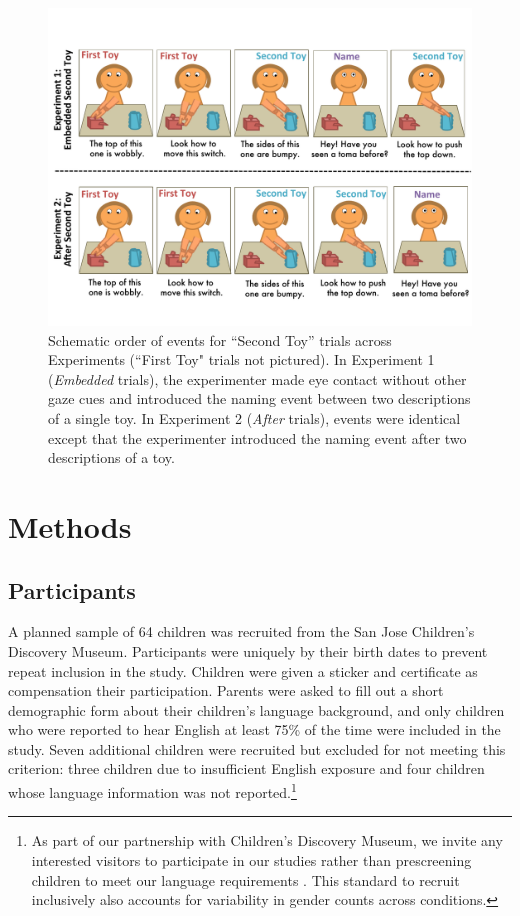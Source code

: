 \documentclass[man]{apa2}
\begin{document}
\begin{figure} 
  \begin{center} 
    \includegraphics[width=6in]{figures/continuity_demo_slide.pdf} 
    \caption{\label{fig:demo} Schematic order of events for ``Second Toy'' trials across Experiments (``First Toy" trials not pictured). In Experiment 1 (\emph{Embedded} trials), the experimenter made eye contact without other gaze cues and introduced the naming event between two descriptions of a single toy.  In Experiment 2 (\emph{After} trials), events were identical except that the experimenter introduced the naming event after two descriptions of a toy.} 
  \end{center} 
\end{figure}	

\section{Methods}


\subsection{Participants}

A planned sample of 64 children was recruited from the San Jose Children's Discovery Museum.  Participants were uniquely by their birth dates to prevent repeat inclusion in the study.  Children were given a sticker and certificate as compensation their participation.  Parents were asked to fill out a short demographic form about their children's language background, and only children who were reported to hear English at least 75\% of the time were included in the study.  Seven additional children were recruited but excluded for not meeting this criterion: three children due to insufficient English exposure and four children whose language information was not reported.\footnote{As part of our partnership with Children's Discovery Museum, we invite any interested visitors to participate in our studies rather than prescreening children to meet our language requirements \cite{callanan2012}. This standard to recruit inclusively also accounts for variability in gender counts across conditions.}
\end{document}
